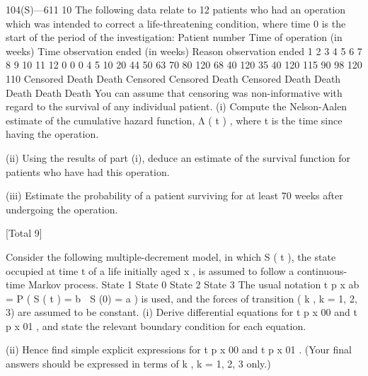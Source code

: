

104(S)—611                               10
The following data relate to 12 patients who had an operation which was
intended to correct a life-threatening condition, where time 0 is the start of the
period of the investigation:
Patient number Time of operation
(in weeks) Time observation
ended (in weeks) Reason observation
ended
1
2
3
4
5
6
7
8
9
10
11
12 0
0
0
4
5
10
20
44
50
63
70
80 120
68
40
120
35
40
120
115
90
98
120
110 Censored
Death
Death
Censored
Censored
Death
Censored
Death
Death
Death
Death
Death
You can assume that censoring was non-informative with regard to the survival
of any individual patient.
(i) Compute the Nelson-Aalen estimate of the cumulative hazard function,
Λ ( t ) , where t is the time since having the operation.

(ii) Using the results of part (i), deduce an estimate of the survival function
for patients who have had this operation.

(iii) Estimate the probability of a patient surviving for at least 70 weeks after
undergoing the operation.

[Total 9]

Consider the following multiple-decrement model, in which S ( t ), the state
occupied at time t of a life initially aged x , is assumed to follow a continuous-time
Markov process.
State 1
State 0
State 2
State 3
The usual notation t p x ab = P ( S ( t ) = b  S (0) = a ) is used, and the forces of
transition ( k , k = 1, 2, 3) are assumed to be constant.
(i) Derive differential equations for t p x 00 and t p x 01 , and state the relevant
boundary condition for each equation.

(ii) Hence find simple explicit expressions for t p x 00 and t p x 01 .
(Your final answers should be expressed in terms of  k , k = 1, 2, 3 only.)


